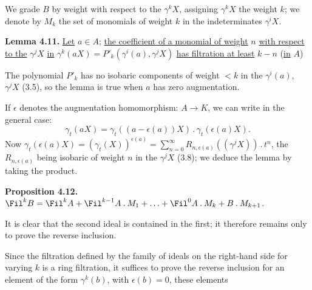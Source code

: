 We grade \(B\) by weight with respect to the \(\gamma^k X\), assigning \(\gamma^k X\) the weight \(k\); we denote by \(M_k\) the set of monomials of weight \(k\) in the indeterminates \(\gamma^i X\).

\textbf{Lemma 4.11.} \uline{Let} \(a\in A\); \uline{the coefficient of a monomial of weight} \(n\) \uline{with respect} \uline{to the} \(\gamma^j X\) \uline{in} \(\gamma^k(aX)=P'_k(\gamma^i(a),\gamma^j X)\) \uline{has filtration at least} \(k-n\) (\uline{in} \(A\))

The polynomial \(P'_k\) has no isobaric components of weight \(<k\) in the \(\gamma^i(a)\), \(\gamma^j X\) (3.5), so the lemma is true when \(a\) has zero augmentation.

If \(\epsilon\) denotes the augmentation homomorphism: \(A\to K\), we can write in the general case:
\[
  \gamma_t(aX)=\gamma_t((a-\epsilon(a))X)\mathbin{.}\gamma_t(\epsilon(a)X).
\]
Now \(\gamma_t(\epsilon(a)X)=(\gamma_t(X))^{\epsilon(a)}=\sum_{n=0}^{\infty}R_{n,\epsilon(a)}((\gamma^j X))\mathbin{.}t^n\), the \(R_{n,\epsilon(a)}\) being isobaric of weight \(n\) in the \(\gamma^j X\) (3.8); we deduce the lemma by taking the product.

\textbf{Proposition 4.12.} \(\Fil^k B=\Fil^k A+\Fil^{k-1}A\mathbin{.}M_1+\ldots+\Fil^0 A\mathbin{.}M_k+B\mathbin{.}M_{k+1}\).

It is clear that the second ideal is contained in the first; it therefore remains only to prove the reverse inclusion.

Since the filtration defined by the family of ideals on the right-hand side for varying \(k\) is a ring filtration, it suffices to prove the reverse inclusion for an element of the form \(\gamma^k(b)\), with \(\epsilon(b)=0\), these elements
